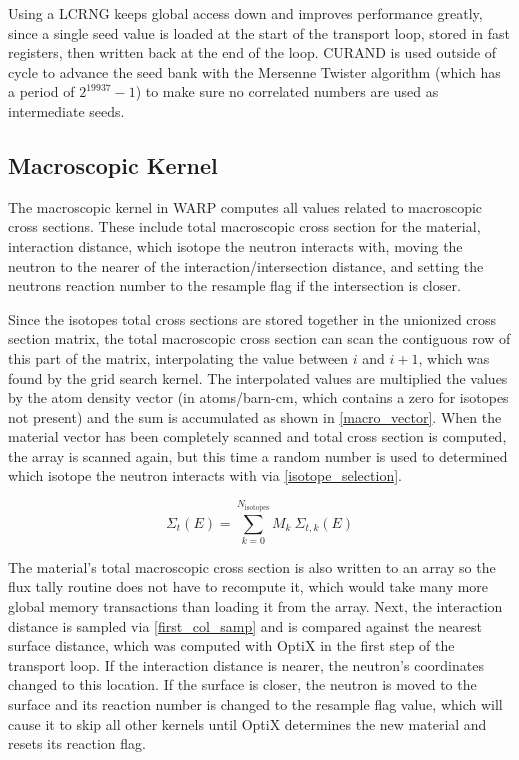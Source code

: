 Using a LCRNG keeps global access down and improves performance greatly, since a single seed value is loaded at the start of the transport loop, stored in fast registers, then written back at the end of the loop.  CURAND is used outside of cycle to advance the seed bank with the Mersenne Twister algorithm (which has a period of $2^{19937} - 1$) to make sure no correlated numbers are used as intermediate seeds.

\subsection{Macroscopic Kernel}

The macroscopic kernel in WARP computes all values related to macroscopic cross sections.  These include total macroscopic cross section for the material, interaction distance, which isotope the neutron interacts with, moving the neutron to the nearer of the interaction/intersection distance, and setting the neutrons reaction number to the resample flag if the intersection is closer.  

Since the isotopes total cross sections are stored together in the unionized cross section matrix, the total macroscopic cross section can scan the contiguous row of this part of the matrix, interpolating the value between $i$ and $i+1$, which was found by the grid search kernel.  The interpolated values are multiplied the values by the atom density vector (in atoms/barn-cm, which contains a zero for isotopes not present) and the sum is accumulated as shown in \eqref{macro_vector}.  When the material vector has been completely scanned and total cross section is computed, the array is scanned again, but this time a random number is used to determined which isotope the neutron interacts with via \eqref{isotope_selection}.

\begin{equation}
\Sigma_t(E) = \sum_{k=0}^{N_\mathrm{isotopes}} M_k \: \Sigma_{t,k}(E)
\label{macro_vector}
\end{equation}

The material's total macroscopic cross section is also written to an array so the flux tally routine does not have to recompute it, which would take many more global memory transactions than loading it from the array.  Next, the interaction distance is sampled via \eqref{first_col_samp} and is compared against the nearest surface distance, which was computed with OptiX in the first step of the transport loop.  If the interaction distance is nearer, the neutron's coordinates changed to this location.  If the surface is closer, the neutron is moved to the surface and its reaction number is changed to the resample flag value, which will cause it to skip all other kernels until OptiX determines the new material and resets its reaction flag.

